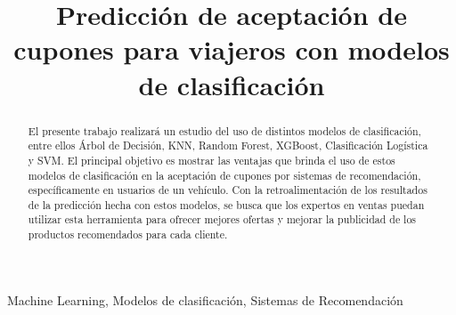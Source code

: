 \documentclass[conference]{IEEEtran}
\begin{document}
\title{Predicción de aceptación de cupones para viajeros con modelos de clasificación}

\author{
\and
{}
\and
{}
}

\maketitle

\begin{abstract}
El presente trabajo realizará un estudio del uso de distintos modelos de clasificación, entre ellos Árbol de Decisión, KNN, Random Forest, XGBoost, Clasificación Logística y SVM. El principal objetivo es mostrar las ventajas que brinda el uso de estos modelos de clasificación en la aceptación de cupones por sistemas de recomendación, específicamente en usuarios de un vehículo. Con la retroalimentación de los resultados de la predicción hecha con estos modelos, se busca que los expertos en ventas puedan utilizar esta herramienta para ofrecer mejores ofertas y mejorar la publicidad de los productos recomendados para cada cliente.
\end{abstract}

\begin{IEEEkeywords}
Machine Learning, Modelos de clasificación, Sistemas de Recomendación
\end{IEEEkeywords}
\end{document}
